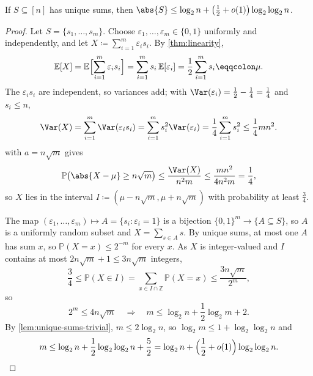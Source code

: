 \begin{proposition}\label{prop:unique-sums}
    If \(S \subseteq [n]\) has unique sums, then \(\abs{S} \le \log_2 n + \bigl( \frac{1}{2} + o(1) \bigr) \log_2 \log_2 n\).
\end{proposition}

\begin{proof}
    Let \(S = \{s_1, \ldots, s_m\}\). Choose \(\varepsilon_1, \ldots, \varepsilon_m \in \{0,1\}\) uniformly and independently, and let \(X \coloneqq \sum_{i=1}^{m} \varepsilon_i s_i\). By \autoref{thm:linearity},
    \[
        \mathbb{E}[X] = \mathbb{E}\Bigl[ \sum_{i=1}^{m} \varepsilon_i s_i \Bigr] = \sum_{i=1}^{m} s_i\, \mathbb{E}[\varepsilon_i] = \frac{1}{2} \sum_{i=1}^{m} s_i \eqqcolon \mu .
    \]
    The \(\varepsilon_i s_i\) are independent, so variances add; with \(\Var(\varepsilon_i) = \frac{1}{2} - \frac{1}{4} = \frac{1}{4}\) and \(s_i \le n\),
    \[
        \Var(X) = \sum_{i=1}^{m} \Var(\varepsilon_i s_i) = \sum_{i=1}^{m} s_i^{2} \Var(\varepsilon_i) = \frac{1}{4} \sum_{i=1}^{m} s_i^{2} \le \frac{1}{4} m n^{2} .
    \]
     with \(a = n\sqrt{m}\) gives
    \[
        \mathbb{P}\bigl( \abs{X - \mu} \ge n\sqrt{m} \bigr) \le \frac{\Var(X)}{n^{2} m} \le \frac{mn^{2}}{4 n^{2} m} = \frac{1}{4},
    \]
    so \(X\) lies in the interval \(I \coloneqq (\mu - n\sqrt{m}, \mu + n\sqrt{m})\) with probability at least \(\frac{3}{4}\).
    \begin{center}
    \end{center}
    The map \((\varepsilon_1, \ldots, \varepsilon_m) \mapsto A = \{s_i : \varepsilon_i = 1\}\) is a bijection \(\{0,1\}^{m} \to \{A \subseteq S\}\), so \(A\) is a uniformly random subset and \(X = \sum_{s \in A} s\). By unique sums, at most one \(A\) has sum \(x\), so \(\mathbb{P}(X = x) \le 2^{-m}\) for every \(x\). As \(X\) is integer-valued and \(I\) contains at most \(2n\sqrt{m} + 1 \le 3n\sqrt{m}\) integers,
    \[
        \frac{3}{4} \le \mathbb{P}(X \in I) = \sum_{x \in I \cap \mathbb{Z}} \mathbb{P}(X = x) \le \frac{3n\sqrt{m}}{2^{m}},
    \]
    so
    \[
        2^{m} \le 4n\sqrt{m}
        \quad\Longrightarrow\quad
        m \le \log_2 n + \frac{1}{2}\log_2 m + 2 .
    \]
    By \autoref{lem:unique-sums-trivial}, \(m \le 2\log_2 n\), so \(\log_2 m \le 1 + \log_2\log_2 n\) and
    \[
        m \le \log_2 n + \frac{1}{2}\log_2\log_2 n + \frac{5}{2} = \log_2 n + \Bigl( \frac{1}{2} + o(1) \Bigr) \log_2\log_2 n . \qedhere
    \]
\end{proof}

